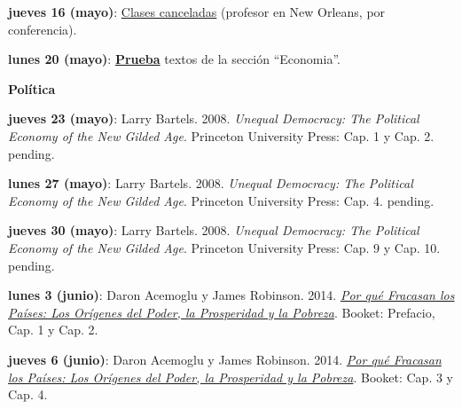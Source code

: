 \documentclass[letterpaper]{article}
\renewenvironment{itemize}{
  \begin{list}{}{
    \setlength{\leftmargin}{1.5em}
  }
}{
  \end{list}
}
\begin{document}
\begin{enumerate}
\begin{itemize}
		\item[] {\bf jueves 16 (mayo)}: {\underline{Clases canceladas} (profesor en New Orleans, por conferencia).}

    \vspace{0.4cm}

     \item[\Pointinghand] {\bf lunes 20 (mayo)}: {\bf \underline{Prueba}} textos de la secci\'on ``Economia''.
	\end{itemize}

\item {\bf Pol\'itica}

	\begin{itemize}

		\item {\bf jueves 23 (mayo)}: Larry Bartels. 2008. \emph{Unequal Democracy: The Political Economy of the New Gilded Age}. Princeton University Press: Cap. 1 y Cap. 2. {\color{red}pending.}

		\vspace{0.2cm}

		\item {\bf lunes 27 (mayo)}: Larry Bartels. 2008. \emph{Unequal Democracy: The Political Economy of the New Gilded Age}. Princeton University Press: Cap. 4. {\color{red}pending.}

		\vspace{0.2cm}

		\item {\bf jueves 30 (mayo)}: Larry Bartels. 2008. \emph{Unequal Democracy: The Political Economy of the New Gilded Age}. Princeton University Press: Cap. 9 y Cap. 10. {\color{red}pending.}

		\vspace{0.2cm}

		\item {\bf lunes 3 (junio)}: Daron Acemoglu y James Robinson. 2014. \href{https://github.com/hbahamonde/Intro_Ciencias_Sociales/raw/master/Readings/Why_Nations_Fail.pdf}{\emph{Por qu\'e Fracasan los Pa\'ises: Los Or\'igenes del Poder, la Prosperidad y la Pobreza}}. Booket: Prefacio, Cap. 1 y Cap. 2.

    \vspace{0.2cm}

		\item {\bf jueves 6 (junio)}: Daron Acemoglu y James Robinson. 2014. \href{https://github.com/hbahamonde/Intro_Ciencias_Sociales/raw/master/Readings/Why_Nations_Fail.pdf}{\emph{Por qu\'e Fracasan los Pa\'ises: Los Or\'igenes del Poder, la Prosperidad y la Pobreza}}. Booket: Cap. 3 y Cap. 4.


\end{itemize}
\end{enumerate}
\end{document}
